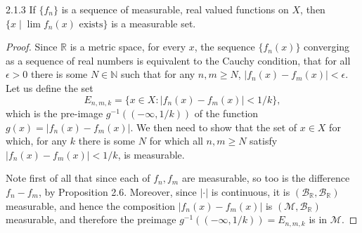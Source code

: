 \documentclass[11pt]{article}
\begin{document}
\begin{problem}{2.1.3}
	If \( \{f_n\} \) is a sequence of measurable, real valued functions on \( X \), then\\
	\( \{ x \mid \lim f_n(x) \text{ exists}\} \) is a measurable set.
\end{problem}
\begin{proof}
	Since \( \mathbb{R} \) is a metric space, for every \( x \), the sequence \( \{ f_n(x) \} \) converging as a sequence of real numbers is equivalent to the Cauchy condition, that for all \(\epsilon > 0\) there is some \( N \in \mathbb{N} \) such that for any \( n, m \geq N \), \( \left| f_n(x) - f_m(x) \right| < \epsilon\).
	Let us define the set
	\begin{equation}
		\label{eq:2}
		E_{n,m,k} = \{ x \in X : \left| f_n(x) - f_m(x) \right| < 1/k \},
	\end{equation}
	which is the pre-image \( g^{-1}((-\infty, 1/k)) \) of the function \( g(x) = | f_n(x) - f_m(x) | \).
	We then need to show that the set of \( x \in X \) for which, for any \( k \) there is some \( N \) for which all \( n,m \geq N \) satisfy \( | f_n(x) - f_m(x) | < 1/k \), is measurable.

	Note first of all that since each of \( f_n, f_m \) are measurable, so too is the difference \( f_n- f_m \), by Proposition 2.6.
	Moreover, since \( | \cdot | \) is continuous, it is \( (\mathcal{B}_{\mathbb{R}}, \mathcal{B}_{\mathbb{R}}) \) measurable, and hence the composition \( | f_n(x) - f_m(x) | \) is \( (\mathcal{M}, \mathcal{B}_{\mathbb{R}}) \) measurable, and therefore the preimage \( g^{-1}((-\infty, 1/k)) = E_{n,m,k} \) is in \( \mathcal{M} \).


\end{proof}
\end{document}
